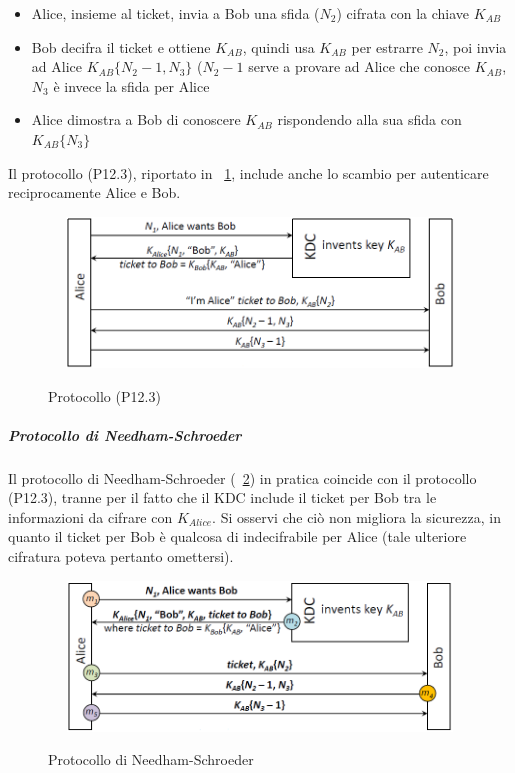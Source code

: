 \begin{itemize}
	\item Alice, insieme al ticket, invia a Bob una sfida ($N_{2}$) cifrata con la chiave $K_{AB}$
	\item Bob decifra il ticket e ottiene $K_{AB}$, quindi usa $K_{AB}$ per estrarre $N_{2}$, poi invia ad Alice $K_{AB}\lbrace N_{2}-1, N_{3}\rbrace$ ($N_{2}-1$ serve a provare ad Alice che conosce $K_{AB}$, $N_{3}$ è invece la sfida per Alice
	\item Alice dimostra a Bob di conoscere $K_{AB}$ rispondendo alla sua sfida con $K_{AB}\lbrace N_{3}\rbrace$
\end{itemize}
Il protocollo (P12.3), riportato in \figurename~\ref{fig:ImgS109bis}, include anche lo scambio per autenticare reciprocamente Alice e Bob.
\begin{figure}[htbp]
	\centering%
	\subfigure%
	{\includegraphics[height=4cm, width=12cm, keepaspectratio]{Immagini/autenticazione/ImgS109bis.png}}
	\caption{Protocollo (P12.3)}\label{fig:ImgS109bis} 	
\end{figure}
\subparagraph{Protocollo di Needham-Schroeder}
Il protocollo di Needham-Schroeder (\figurename~\ref{fig:ImgS111bis}) in pratica coincide con il protocollo (P12.3),  tranne per il fatto che il KDC include il ticket per Bob tra le informazioni da cifrare con $K_{Alice}$. Si osservi che ciò non migliora la sicurezza, in quanto il ticket per Bob è qualcosa di indecifrabile per Alice (tale ulteriore cifratura poteva pertanto omettersi).
\begin{figure}[htbp]
	\centering%
	\subfigure%
	{\includegraphics[height=4cm, width=12cm, keepaspectratio]{Immagini/autenticazione/ImgS111bis.png}}
	\caption{Protocollo di Needham-Schroeder}\label{fig:ImgS111bis} 	
\end{figure}

